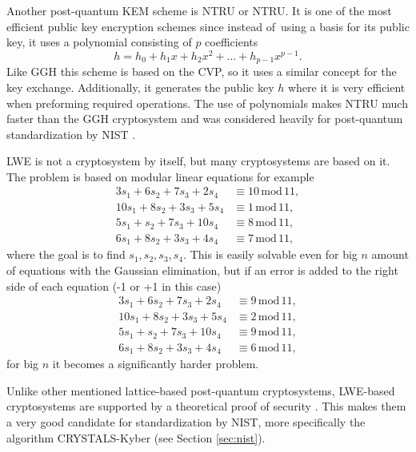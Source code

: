 Another post-quantum KEM scheme is NTRU or \acl{NTRU}. It is one of the most efficient public key encryption schemes since instead of~using a basis for its public key, it uses a polynomial consisting of $p$ coefficients
\begin{equation}
  h=h_0+h_1x+h_2x^2+\dots+h_{p-1}x^{p-1}.
\end{equation}
Like GGH this scheme is based on the CVP, so it uses a similar concept for the key exchange. Additionally, it generates the public key $h$ where it is very efficient when preforming required operations. The use of polynomials makes NTRU much faster than the GGH cryptosystem and was considered heavily for post-quantum standardization by NIST \cite{Bernstein149}.

LWE is not a cryptosystem by itself, but many cryptosystems are based on it. The problem is based on modular linear equations for example
\begin{align}
  3s_1+6s_2+7s_3+2s_4  & \equiv 10\,\mathrm{mod}\,11, \\
  10s_1+8s_2+3s_3+5s_4 & \equiv 1\,\mathrm{mod}\,11,  \\
  5s_1+s_2+7s_3+10s_4  & \equiv 8\,\mathrm{mod}\,11,  \\
  6s_1+8s_2+3s_3+4s_4  & \equiv 7\,\mathrm{mod}\,11,
\end{align}
where the goal is to find $s_1, s_2, s_3, s_4$. This is easily solvable even for big $n$ amount of equations with the Gaussian elimination, but if an error is added to the right side of each equation (-1 or +1 in this case)
\begin{align}
  3s_1+6s_2+7s_3+2s_4  & \equiv 9\,\mathrm{mod}\,11, \\
  10s_1+8s_2+3s_3+5s_4 & \equiv 2\,\mathrm{mod}\,11, \\
  5s_1+s_2+7s_3+10s_4  & \equiv 9\,\mathrm{mod}\,11, \\
  6s_1+8s_2+3s_3+4s_4  & \equiv 6\,\mathrm{mod}\,11,
\end{align}
for big $n$ it becomes a significantly harder problem. \cite{Regev2005}

Unlike other mentioned lattice-based post-quantum cryptosystems, LWE-based cryptosystems are supported by a theoretical proof of security \cite{Bernstein2009}. This makes them a very good candidate for standardization by NIST, more specifically the algorithm CRYSTALS-Kyber (see Section \ref{sec:nist}).
